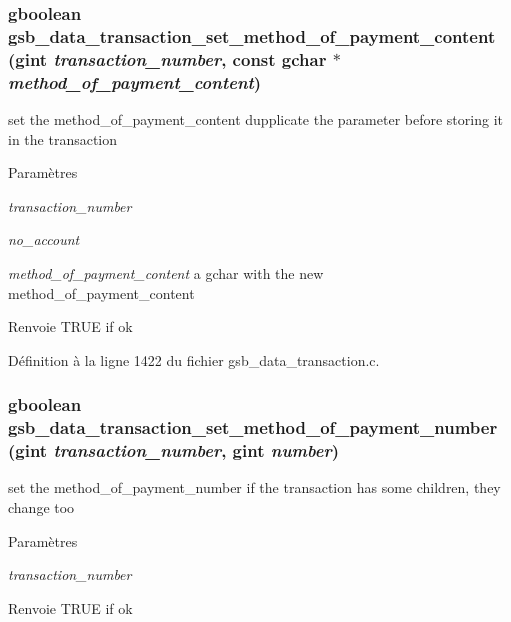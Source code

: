 \subsubsection[{gsb\_\-data\_\-transaction\_\-set\_\-method\_\-of\_\-payment\_\-content}]{\setlength{\rightskip}{0pt plus 5cm}gboolean gsb\_\-data\_\-transaction\_\-set\_\-method\_\-of\_\-payment\_\-content (gint {\em transaction\_\-number}, \/  const gchar $\ast$ {\em method\_\-of\_\-payment\_\-content})}\label{gsb__data__transaction_8h_ac4d8a66d20d37abac0fd3af84460921c}
set the method\_\-of\_\-payment\_\-content dupplicate the parameter before storing it in the transaction


\begin{DoxyParams}{Paramètres}
\item[{\em transaction\_\-number}]\item[{\em no\_\-account}]\item[{\em method\_\-of\_\-payment\_\-content}]a gchar with the new method\_\-of\_\-payment\_\-content \end{DoxyParams}
\begin{DoxyReturn}{Renvoie}
TRUE if ok 
\end{DoxyReturn}


Définition à la ligne 1422 du fichier gsb\_\-data\_\-transaction.c.

\subsubsection[{gsb\_\-data\_\-transaction\_\-set\_\-method\_\-of\_\-payment\_\-number}]{\setlength{\rightskip}{0pt plus 5cm}gboolean gsb\_\-data\_\-transaction\_\-set\_\-method\_\-of\_\-payment\_\-number (gint {\em transaction\_\-number}, \/  gint {\em number})}\label{gsb__data__transaction_8h_a2ec47094f3a4b930dc6057f574af8019}
set the method\_\-of\_\-payment\_\-number if the transaction has some children, they change too


\begin{DoxyParams}{Paramètres}
\item[{\em transaction\_\-number}]\item[{\em }]\end{DoxyParams}
\begin{DoxyReturn}{Renvoie}
TRUE if ok 
\end{DoxyReturn}


